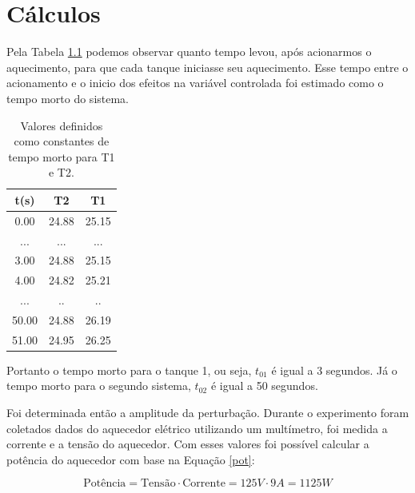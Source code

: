 \chapter{Cálculos}


Pela Tabela \ref{tab1} podemos observar quanto tempo levou, após acionarmos o aquecimento, para que cada tanque iniciasse seu aquecimento. Esse tempo entre o acionamento e o inicio dos efeitos na variável controlada foi estimado como o tempo morto do sistema. 

\begin{table}[H]
	\centering
	\begin{tabular}{|c|c|c|}
		\hline
		\textbf{t(s)}                 & \textbf{T2}                   & \textbf{T1}                   \\ \hline
		0.00                          & 24.88                         & 25.15                         \\ \hline
		...                           & ...                           & ...                           \\ \hline
		\cellcolor[HTML]{F8FF00}3.00  & 24.88                         & \cellcolor[HTML]{F8FF00}25.15 \\ \hline
		4.00                          & 24.82                         & 25.21                         \\ \hline
		...                           & ..                            & ..                            \\ \hline
		\cellcolor[HTML]{FCFF2F}50.00 & \cellcolor[HTML]{FCFF2F}24.88 & 26.19                         \\ \hline
		51.00                         & 24.95                         & 26.25                         \\ \hline
	\end{tabular}
\caption{Valores definidos como constantes de tempo morto para T1 e T2.}
\label{tab1}
\end{table}

Portanto o tempo morto para o tanque 1, ou seja, $ t_{01} $ é igual a 3 segundos. Já o tempo morto para o segundo sistema, $ t_{02} $ é igual a 50 segundos.

Foi determinada então a amplitude da perturbação. Durante o experimento foram coletados dados do aquecedor elétrico utilizando um multímetro, foi medida a corrente e a tensão do aquecedor. Com esses valores foi possível calcular a potência do aquecedor com base na Equação \ref{pot}:

\begin{equation}\label{pot}
\text{Potência}= \text{Tensão} \cdot \text{Corrente} = 125 V \cdot 9 A=1125 W
\end{equation}

